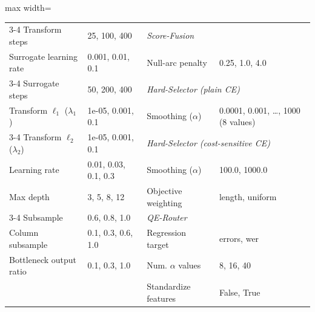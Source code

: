 \begin{table}[t]
\begin{adjustbox}{max width=\linewidth}
\begin{tabular}{ll@{\hspace{2em}}ll}
        \cmidrule(lr){3-4}
        Transform steps & {25, 100, 400} & \multicolumn{2}{l}{\textit{Score-Fusion}} \\
        Surrogate learning rate & {0.001, 0.01, 0.1} & Null-arc penalty & {0.25, 1.0, 4.0} \\
        \cmidrule(lr){3-4}
        Surrogate steps & {50, 200, 400} & \multicolumn{2}{l}{\textit{Hard-Selector (plain CE)}} \\
        Transform $\ell_1$ ($\lambda_1$) & {1e-05, 0.001, 0.1} & Smoothing ($\alpha$) & {0.0001, 0.001, \ldots, 1000 (8 values)} \\
        \cmidrule(lr){3-4}
        Transform $\ell_2$ ($\lambda_2$) & {1e-05, 0.001, 0.1} & \multicolumn{2}{l}{\textit{Hard-Selector (cost-sensitive CE)}} \\
        Learning rate & {0.01, 0.03, 0.1, 0.3} & Smoothing ($\alpha$) & {100.0, 1000.0} \\
        Max depth & {3, 5, 8, 12} & Objective weighting & {length, uniform} \\
        \cmidrule(lr){3-4}
        Subsample & {0.6, 0.8, 1.0} & \multicolumn{2}{l}{\textit{QE-Router}} \\
        Column subsample & {0.1, 0.3, 0.6, 1.0} & Regression target & {errors, wer} \\
        Bottleneck output ratio & {0.1, 0.3, 1.0} & Num. $\alpha$ values & {8, 16, 40} \\
         &  & Standardize features & {False, True} \\
        \bottomrule
    \end{tabular}
    \end{adjustbox}
\end{table}
